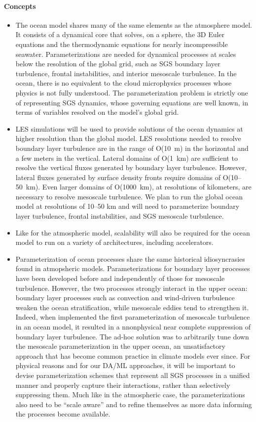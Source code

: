 \documentclass{article}
\begin{document}
\paragraph{Concepts}
\begin{itemize}
    \item The ocean model shares many of the same elements as the atmosphere model. It consists of a dynamical core that solves, on a sphere, the 3D Euler equations and the thermodynamic equations for nearly incompressible seawater. Parameterizations are needed for dynamical processes at scales below the resolution of the global grid, such as SGS boundary layer turbulence, frontal instabilities, and interior mesoscale turbulence. In the ocean, there is no equivalent to the cloud microphysics processes whose physics is not fully understood. The parameterization problem is strictly one of representing SGS dynamics, whose governing equations are well known, in terms of variables resolved on the model's global grid.
    \item LES simulations will be used to provide solutions of the ocean dynamics at higher resolution than the global model. LES resolutions needed to resolve boundary layer turbulence are in the range of O(10~m) in the horizontal and a few meters in the vertical. Lateral domains of O(1~km) are sufficient to resolve the vertical fluxes generated by boundary layer turbulence. However, lateral fluxes generated by surface density fronts require domains of O(10--50~km). Even larger domains of O(1000~km), at resolutions of kilometers, are necessary to resolve mesoscale turbulence. We plan to run the global ocean model at resolutions of 10--50 km and will need to parameterize boundary layer turbulence, frontal instabilities, and SGS mesoscale turbulence.
    \item Like for the atmospheric model, scalability will also be required for the ocean model to run on a variety of architectures, including accelerators. 
    \item Parameterization of ocean processes share the same historical idiosyncrasies found in atmopsheric models. Parameterizations for boundary layer processes have been developed before and independently of those for mesoscale turbulence. However, the two processes strongly interact in the upper ocean: boundary layer processes such as convection and wind-driven turbulence weaken the ocean stratification, while mesoscale eddies tend to strengthen it. Indeed, when \citet{Gent90} implemented the first parameterization of mesoscale turbulence in an ocean model, it resulted in a nnonphysical near complete suppression of boundary layer turbulence. The ad-hoc solution was to arbitrarily tune down the mesoscale parameterization in the upper ocean, an unsatisfactory approach that has become common practice in climate models ever since. For  physical reasons and for our DA/ML approaches, it will be important to devise parameterization schemes that represent all SGS processes in a unified manner and properly capture their interactions, rather than selectively suppressing them. Much like in the atmospheric case, the parameterizations also need to be ``scale aware'' and to refine themselves as more data informing the processes become available. 

\end{itemize}
\end{document}
